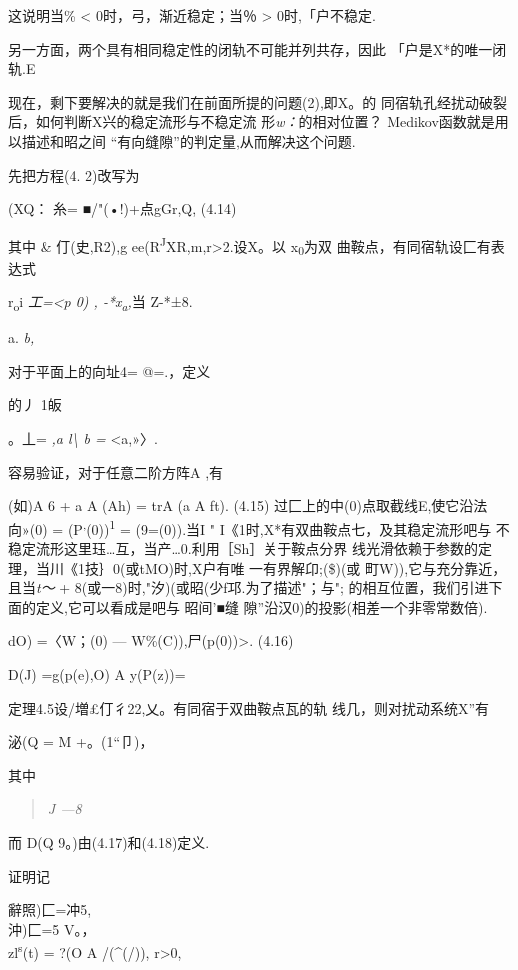 \documentclass{article}
\begin{document}
这说明当\% \textless{} 0时，弓，渐近稳定；当％ \textgreater{}
0时,「户不稳定.

另一方面，两个具有相同稳定性的闭轨不可能并列共存，因此
「户是X*的唯一闭轨.E

现在，剩下要解决的就是我们在前面所提的问题(2),即X。的
同宿轨孔经扰动破裂后，如何判断X兴的稳定流形与不稳定流
形\emph{w：}的相对位置？ Medikov函数就是用以描述和昭之间
``有向缝隙''的判定量,从而解决这个问题.

先把方程(4. 2)改写为

(XQ： 糸= ■/"(•!)+点gGr,Q, (4.14)

其中 \& 仃(史,R2),g ee(R\textsuperscript{J}XR,m,r\textgreater{}2.设X。以
x\textsubscript{0}为双 曲鞍点，有同宿轨设匚有表达式

r\textsubscript{o}i \emph{工=\textless{}p 0) , -*x\textsubscript{a},}当
Z-*±8.

a. \emph{b,}

对于平面上的向址4= @=.，定义

的丿 1皈

。丄= \emph{,a l\textbackslash{} b =} \textless{}a,»〉.

容易验证，对于任意二阶方阵A ,有

(如)A 6 + a A (Ah) = trA (a A ft). (4.15)
过匚上的中(0)点取截线E,使它沿法向»(0) =
(P\textsuperscript{,}(0))\textsuperscript{1} = (9=(0)).当I "
I《1时,X*有双曲鞍点七，及其稳定流形吧与
不稳定流形这里珏\ldots{}互，当产\ldots{}0.利用［Sh］关于鞍点分界
线光滑依赖于参数的定理，当\textbar{}川《1技｝0(或tMO)时,X户有唯
一有界解卬;(\$)(或 町W)),它与充分靠近，且当\emph{t〜} +
8(或一8)时,"汐)(或昭(少f邛.为了描述"；与";
的相互位置，我们引进下面的定义,它可以看成是吧与 昭间'■缝
隙''沿汉0)的投影(相差一个非零常数倍).

dO) =〈W；(0) --- W\%(C)),尸(p(0))\textgreater{}. (4.16)

D(J) =g(p(e),O) A y(P(z))=

定理4.5设/増£仃彳22,乂。有同宿于双曲鞍点瓦的轨 线几，则对扰动系统X''有

泌(Q = M +。(1``卩)，

其中

\begin{quote}
\emph{J ---8}
\end{quote}

而 D(Q 9。)由(4.17)和(4.18)定义.

证明记

辭照)匚=冲5,\\
沖)匚=5 V。，\\
zl\textsuperscript{s}(t) = ?(O A /(\^{}(/)), r\textgreater{}0,
\end{document}
